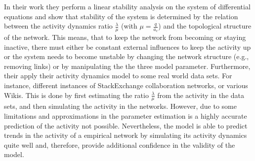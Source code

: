 In their work they perform a linear stability analysis on the system of differential equations and show that stability of the system is determined by the relation between the activity dynamics ratio \( \frac{\lambda}{\mu} \) (with \( \mu = \frac{q}{a_{c}} \)) and the topological structure of the network.
This means, that to keep the network from becoming or staying inactive, there must either be constant external influences to keep the activity up or the system needs to become unstable by changing the network structure (e.g., removing links) or by manipulating the the three model parameter.
Furthermore, their apply their activity dynamics model to some real world data sets.
For instance, different instances of StackExchange collaboration networks, or various Wikis.
This is done by first estimating the ratio \( \frac{\lambda}{\mu} \) from the activity in the data sets, and then simulating the activity in the networks.
However, due to some limitations and approximations in the parameter estimation is a highly accurate prediction of the activity not possible.
Nevertheless, the model is able to predict trends in the activity of a empirical network by simulating its activity dynamics quite well and, therefore, provide additional confidence in the validity of the model.
